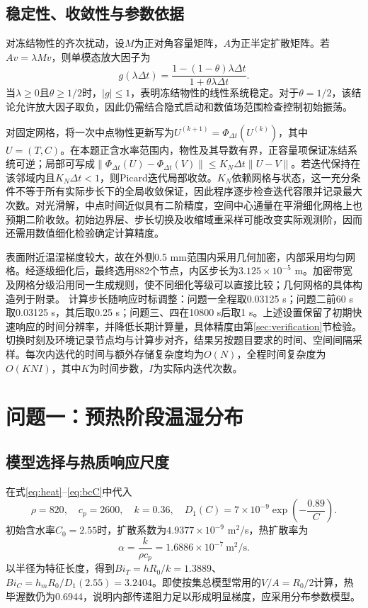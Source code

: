 \subsection{稳定性、收敛性与参数依据}
对冻结物性的齐次扰动，设$M$为正对角容量矩阵，$A$为正半定扩散矩阵。若$A v=\lambda Mv$，则单模态放大因子为
\begin{equation}
g(\lambda\Delta t)=\frac{1-(1-\theta)\lambda\Delta t}{1+\theta\lambda\Delta t}.
\end{equation}
当$\lambda\ge0$且$\theta\ge1/2$时，$|g|\le1$，表明冻结物性的线性系统稳定。对于$\theta=1/2$，该结论允许放大因子取负，因此仍需结合隐式启动和数值场范围检查控制初始振荡。

对固定网格，将一次中点物性更新写为$U^{(k+1)}=\Phi_{\Delta t}(U^{(k)})$，其中$U=(T,C)$。在本题正含水率范围内，物性及其导数有界，正容量项保证冻结系统可逆；局部可写成$\|\Phi_{\Delta t}(U)-\Phi_{\Delta t}(V)\|\le K_N\Delta t\|U-V\|$。若迭代保持在该邻域内且$K_N\Delta t<1$，则Picard迭代局部收敛。$K_N$依赖网格与状态，这一充分条件不等于所有实际步长下的全局收敛保证，因此程序逐步检查迭代容限并记录最大次数。对光滑解，中点时间近似具有二阶精度，空间中心通量在平滑细化网格上也预期二阶收敛。初始边界层、步长切换及收缩域重采样可能改变实际观测阶，因而还需用数值细化检验确定计算精度\cite{num}。

表面附近温湿梯度较大，故在外侧0.5 mm范围内采用几何加密，内部采用均匀网格。经逐级细化后，最终选用882个节点，内区步长为$3.125\times10^{-5}$ m。加密带宽及网格分级沿用同一生成规则，使不同细化等级可以直接比较；几何网格的具体构造列于附录。
计算步长随响应时标调整：问题一全程取0.03125 s；问题二前60 s取0.03125 s，其后取0.25 s；问题三、四在10800 s后取1 s。上述设置保留了初期快速响应的时间分辨率，并降低长期计算量，具体精度由第\ref{sec:verification}节检验。切换时刻及环境记录节点均与计算步对齐，结果另按题目要求的时间、空间间隔采样。每次内迭代的时间与额外存储复杂度均为$O(N)$，全程时间复杂度为$O(KNI)$，其中$K$为时间步数，$I$为实际内迭代次数。

\section{问题一：预热阶段温湿分布}
\subsection{模型选择与热质响应尺度}
在式\eqref{eq:heat}--\eqref{eq:bcC}中代入
\begin{equation}
\rho=820,\quad c_p=2600,\quad k=0.36,\quad
D_1(C)=7\times10^{-9}\exp\left(-\frac{0.89}{C}\right).
\label{eq:p1prop}
\end{equation}
初始含水率$C_0=2.55$时，扩散系数为$4.9377\times10^{-9}$ m$^2$/s，热扩散率为
\begin{equation}
\alpha=\frac{k}{\rho c_p}=1.6886\times10^{-7}\ \mathrm{m^2/s}.
\end{equation}
以半径为特征长度，得到$Bi_T=hR_0/k=1.3889$、$Bi_C=h_mR_0/D_1(2.55)=3.2404$。即使按集总模型常用的$V/A=R_0/2$计算，热毕渥数仍为0.6944，说明内部传递阻力足以形成明显梯度，应采用分布参数模型。

